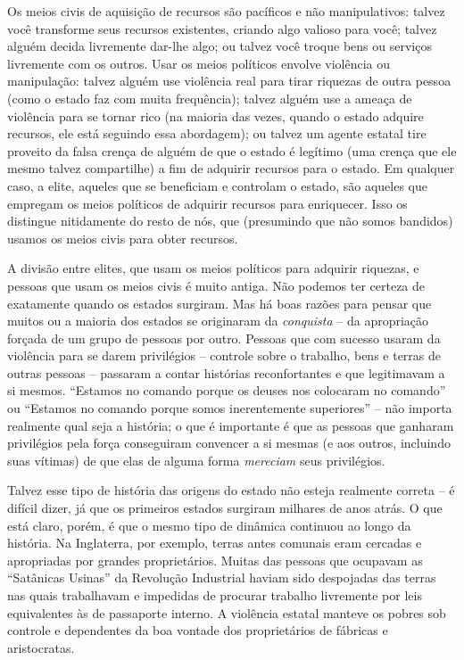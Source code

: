 Os meios civis de aquisição de recursos são pacíficos e não manipulativos: talvez você transforme seus recursos existentes, criando algo valioso para você; talvez alguém decida livremente dar-lhe algo; ou talvez você troque bens ou serviços livremente com os outros. Usar os meios políticos envolve violência ou manipulação: talvez alguém use violência real para tirar riquezas de outra pessoa (como o estado faz com muita frequência); talvez alguém use a ameaça de violência para se tornar rico (na maioria das vezes, quando o estado adquire recursos, ele está seguindo essa abordagem); ou talvez um agente estatal tire proveito da falsa crença de alguém de que o estado é legítimo (uma crença que ele mesmo talvez compartilhe) a fim de adquirir recursos para o estado. Em qualquer caso, a elite, aqueles que se beneficiam e controlam o estado, são aqueles que empregam os meios políticos de adquirir recursos para enriquecer. Isso os distingue nitidamente do resto de nós, que (presumindo que não somos bandidos) usamos os meios civis para obter recursos.

A divisão entre elites, que usam os meios políticos para adquirir riquezas, e pessoas que usam os meios civis é muito antiga. Não podemos ter certeza de exatamente quando os estados surgiram. Mas há boas razões para pensar que muitos ou a maioria dos estados se originaram da \emph{conquista} -- da apropriação forçada de um grupo de pessoas por outro. Pessoas que com sucesso usaram da violência para se darem privilégios -- controle sobre o trabalho, bens e terras de outras pessoas -- passaram a contar histórias reconfortantes e que legitimavam a si mesmos. ``Estamos no comando porque os deuses nos colocaram no comando'' ou ``Estamos no comando porque somos inerentemente superiores'' -- não importa realmente qual seja a história; o que é importante é que as pessoas que ganharam privilégios pela força conseguiram convencer a si mesmas (e aos outros, incluindo suas vítimas) de que elas de alguma forma \emph{mereciam} seus privilégios.

Talvez esse tipo de história das origens do estado não esteja realmente correta -- é difícil dizer, já que os primeiros estados surgiram milhares de anos atrás. O que está claro, porém, é que o mesmo tipo de dinâmica continuou ao longo da história. Na Inglaterra, por exemplo, terras antes comunais eram cercadas e apropriadas por grandes proprietários. Muitas das pessoas que ocupavam as ``Satânicas Usinas'' da Revolução Industrial haviam sido despojadas das terras nas quais trabalhavam e impedidas de procurar trabalho livremente por leis equivalentes às de passaporte interno. A violência estatal manteve os pobres sob controle e dependentes da boa vontade dos proprietários de fábricas e aristocratas.

